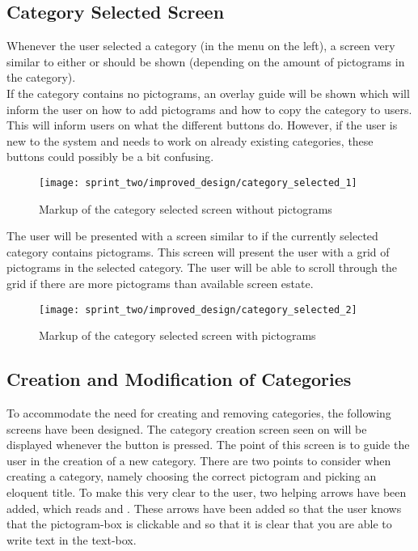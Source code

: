\subsection{Category Selected Screen}
\label{sec:category_selected_screen}
Whenever the user selected a category (in the menu on the left), a screen very similar to either  or  should be shown (depending on the amount of pictograms in the category).\\

If the category contains no pictograms, an overlay guide will be shown which will inform the user on how to add pictograms and how to copy the category to users. This will inform users on what the different buttons do. However, if the user is new to the system and needs to work on already existing categories, these buttons could possibly be a bit confusing. \\


\begin{figure}[!htbp]
    \centering
    \texttt{[image: sprint\_two/improved\_design/category\_selected\_1]}
    \caption{Markup of the category selected screen without pictograms}
    \label{fig:improved_design_category_selected_1}
\end{figure}

The user will be presented with a screen similar to  if the currently selected category contains pictograms. This screen will present the user with a grid of pictograms in the selected category. The user will be able to scroll through the grid if there are more pictograms than available screen estate. 

\begin{figure}[!htbp]
    \centering
    \texttt{[image: sprint\_two/improved\_design/category\_selected\_2]}
    \caption{Markup of the category selected screen with pictograms}
    \label{fig:improved_design_category_selected_2}
\end{figure}

\subsection{Creation and Modification of Categories}
To accommodate the need for creating and removing categories, the following screens have been designed. The category creation screen seen on  will be displayed whenever the  button is pressed. The point of this screen is to guide the user in the creation of a new category. There are two points to consider when creating a category, namely choosing the correct pictogram and picking an eloquent title. To make this very clear to the user, two helping arrows have been added, which reads  and . These arrows have been added so that the user knows that the pictogram-box is clickable and so that it is clear that you are able to write text in the text-box. 

